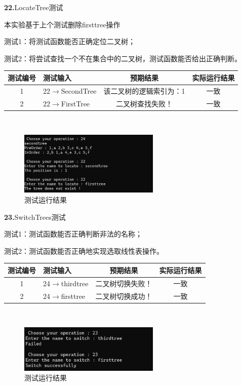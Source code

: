 \documentclass[supercite]{Experimental_Report}
\theoremstyle{definition}
\begin{document}
\noindent\textbf{22.}LocateTree测试

本实验基于上个测试删除firsttree操作

测试1：将测试函数能否正确定位二叉树；

测试2：将尝试查找一个不在集合中的二叉树，测试函数能否给出正确判断。

\vspace{0.5em}

\begin{tabular}{|c|p{2.7cm}|c|c|}
	\hline
	测试编号 & 测试输入 & 预期结果 & 实际运行结果 \\
	\hline
	1 & 22$\rightarrow$SecondTree & 该二叉树的逻辑索引为：1 & 一致 \\
	\hline
	2 & 22$\rightarrow$FirstTree & 二叉树查找失败！ & 一致 \\
	\hline
\end{tabular}

~\

\begin{figure}[H]
 	\centering
 	\includegraphics[width=0.6\textwidth]{images/二叉树测试22.png}
 	\caption{测试运行结果}
 	\label{txlab}
 \end{figure}

\noindent\textbf{23.}SwitchTrees测试
	
测试1：测试函数能否正确判断非法的名称；

测试2：测试函数能否正确地实现选取线性表操作。

\vspace{0.5em}

\begin{tabular}{|c|p{2.7cm}|c|c|}
	\hline
	测试编号 & 测试输入 & 预期结果 & 实际运行结果 \\
	\hline
	1 & 24$\rightarrow$thirdtree & 二叉树切换失败！ & 一致 \\
	\hline
	2 & 24$\rightarrow$firsttree & 二叉树切换成功！ & 一致 \\
	\hline
\end{tabular}

~\

\begin{figure}[H]
 	\centering
 	\includegraphics[width=0.6\textwidth]{images/二叉树测试23.png}
 	\caption{测试运行结果}
 	\label{txlab}
 \end{figure}
\end{document}
